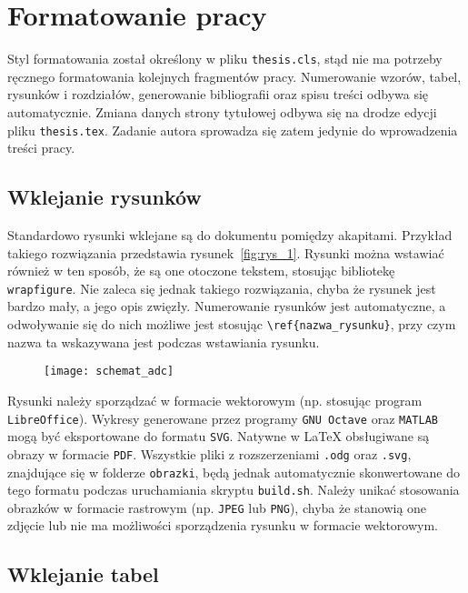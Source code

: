 \chapter{Formatowanie pracy}

Styl formatowania został określony w pliku \texttt{thesis.cls}, stąd nie ma potrzeby ręcznego formatowania kolejnych fragmentów pracy. Numerowanie wzorów, tabel, rysunków i rozdziałów, generowanie bibliografii oraz spisu treści odbywa się automatycznie. Zmiana danych strony tytułowej odbywa się na drodze edycji pliku \texttt{thesis.tex}. Zadanie autora sprowadza się zatem jedynie do wprowadzenia treści pracy.

\section{Wklejanie rysunków}

Standardowo rysunki wklejane są do dokumentu pomiędzy akapitami. Przykład takiego rozwiązania przedstawia rysunek~\ref{fig:rys_1}. Rysunki można wstawiać również w ten sposób, że są one otoczone tekstem, stosując bibliotekę \texttt{wrapfigure}. Nie zaleca się jednak takiego rozwiązania, chyba że rysunek jest bardzo mały, a jego opis zwięzły. Numerowanie rysunków jest automatyczne, a odwoływanie się do nich możliwe jest stosując \verb|\ref{nazwa_rysunku}|, przy czym nazwa ta wskazywana jest podczas wstawiania rysunku.

\begin{figure}[htb!]
\texttt{[image: schemat\_adc]}
\end{figure}

Rysunki należy sporządzać w formacie wektorowym (np. stosując program \texttt{LibreOffice}). Wykresy generowane przez programy \texttt{GNU Octave} oraz \texttt{MATLAB} mogą być eksportowane do formatu \texttt{SVG}. Natywne w \LaTeX{} obsługiwane są obrazy w formacie \texttt{PDF}. Wszystkie pliki z rozszerzeniami \texttt{.odg} oraz \texttt{.svg}, znajdujące się w folderze \texttt{obrazki}, będą jednak automatycznie skonwertowane do tego formatu podczas uruchamiania skryptu \texttt{build.sh}. Należy unikać stosowania obrazków w formacie rastrowym (np. \texttt{JPEG} lub \texttt{PNG}), chyba że stanowią one zdjęcie lub nie ma możliwości sporządzenia rysunku w formacie wektorowym.

\section{Wklejanie tabel}

